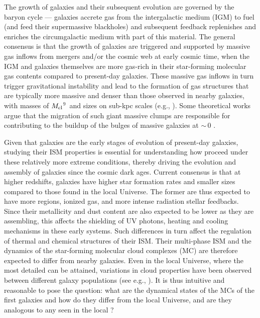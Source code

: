 \IfFileExists{emulateapjlegacy.cls}{\documentclass[iop]{emulateapjlegacy}}{\documentclass[iop]{emulateapj}}
\begin{document}
The growth of galaxies and their subsequent evolution are governed by the baryon cycle ---
galaxies accrete gas from the intergalactic medium (IGM) to fuel \SF (and feed their supermassive blackholes)
and subsequent feedback replenishes and enriches the circumgalactic medium with part of this material.
The general consensus is that the growth of \highz galaxies are triggered and supported by massive
gas inflows from mergers and/or the cosmic web at early cosmic time, when the IGM and galaxies themselves
are more gas-rich in their star-forming molecular
gas contents compared to present-day galaxies.
These massive gas inflows in turn trigger gravitational instability and lead
to the formation of gas structures that are typically more massive and denser than those
observed in nearby galaxies, with masses of $M_{\rm cl}$$^9$\,\Msun
and sizes on sub-kpc scales (e.g., \citealt{Gabor13a, Hopkins14a, Inoue16a}).
Some theoretical works argue that the
migration of such giant massive clumps are responsible for contributing to the
buildup of the bulges of massive galaxies at \z$\sim$\,0 \citep[e.g.,][]{Ceverino10a}.

Given that \highz galaxies are the early stages of evolution of present-day galaxies, studying their ISM properties is essential for understanding how \SF proceed under these relatively more extreme conditions, thereby driving the evolution and assembly
of galaxies
since the cosmic dark ages.
Current consensus is that at higher redshifts, galaxies have higher
star formation rates \citep[SFR; ][]{Behroozi13b, Sparre15a, Maiolino15a, Dunlop17a} and
smaller sizes \citep[e.g.,][]{Bouwens11a, Ono13a} compared to those found in the local Universe.
The former are thus expected to have more  regions, ionized gas, and more intense radiation stellar feedbacks.
Since their metallicity and dust content are also expected to be lower as they are assembling,
this affects the shielding of UV photons, heating and cooling mechanisms in these early systems. Such differences in turn
affect the regulation of thermal and chemical structures of their ISM.
Their multi-phase ISM and the dynamics of the star-forming molecular cloud complexes (MC)
are therefore expected to differ from nearby galaxies.
Even in the local Universe, where the most detailed \obs can be attained, variations in cloud properties have been
observed between different galaxy populations (see e.g., \citealt{Hughes10a, Hughes13b}).
It is thus intuitive and reasonable to pose the question: what are the dynamical states of the MCs of the first galaxies and
how do they differ from the local Universe, and are they analogous to any seen in the local \galpop?
%
\end{document}
